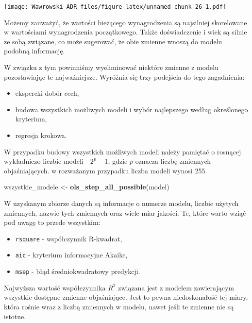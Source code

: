 \documentclass[]{book}
\newenvironment{Shaded}{\begin{snugshade}}{\end{snugshade}}
\newcommand{\KeywordTok}[1]{\textcolor[rgb]{0.13,0.29,0.53}{\textbf{#1}}}
\newcommand{\NormalTok}[1]{#1}
\newcommand{\StringTok}[1]{\textcolor[rgb]{0.31,0.60,0.02}{#1}}
\providecommand{\tightlist}{%
  \setlength{\itemsep}{0pt}\setlength{\parskip}{0pt}}
\begin{document}
\texttt{[image: Wawrowski\_ADR\_files/figure-latex/unnamed-chunk-26-1.pdf]}

Możemy zauważyć, że wartości bieżącego wynagrodzenia są najsilniej skorelowane w wartościami wynagrodzenia początkowego. Także doświadczenie i wiek są silnie ze sobą związane, co może sugerować, że obie zmienne wnoszą do modelu podobną informację.

W związku z tym powinniśmy wyeliminować niektóre zmienne z modelu pozostawiając te najważniejsze. Wyróżnia się trzy podejścia do tego zagadnienia:

\begin{itemize}
\tightlist
\item
  ekspercki dobór cech,
\item
  budowa wszystkich możliwych modeli i wybór najlepszego według określonego kryterium,
\item
  regresja krokowa.
\end{itemize}

W przypadku budowy wszystkich możliwych modeli należy pamiętać o rosnącej wykładniczo liczbie modeli - \(2^p-1\), gdzie \(p\) oznacza liczbę zmiennych objaśniających. w rozważanym przypadku liczba modeli wynosi 255.

\begin{Shaded}
\begin{Highlighting}[]
\NormalTok{wszystkie_modele <-}\StringTok{ }\KeywordTok{ols_step_all_possible}\NormalTok{(model)}
\end{Highlighting}
\end{Shaded}

W uzyskanym zbiorze danych są informacje o numerze modelu, liczbie użytych zmiennych, nazwie tych zmiennych oraz wiele miar jakości. Te, które warto wziąć pod uwagę to przede wszystkim:

\begin{itemize}
\tightlist
\item
  \texttt{rsquare} - współczynnik R-kwadrat,
\item
  \texttt{aic} - kryterium informacyjne Akaike,
\item
  \texttt{msep} - błąd średniokwadratowy predykcji.
\end{itemize}

Najwyższa wartość współczynnika \(R^2\) związana jest z modelem zawierającym wszystkie dostępne zmienne objaśniające. Jest to pewna niedoskonałość tej miary, która rośnie wraz z liczbą zmiennych w modelu, nawet jeśli te zmienne nie są istotne.
\end{document}
